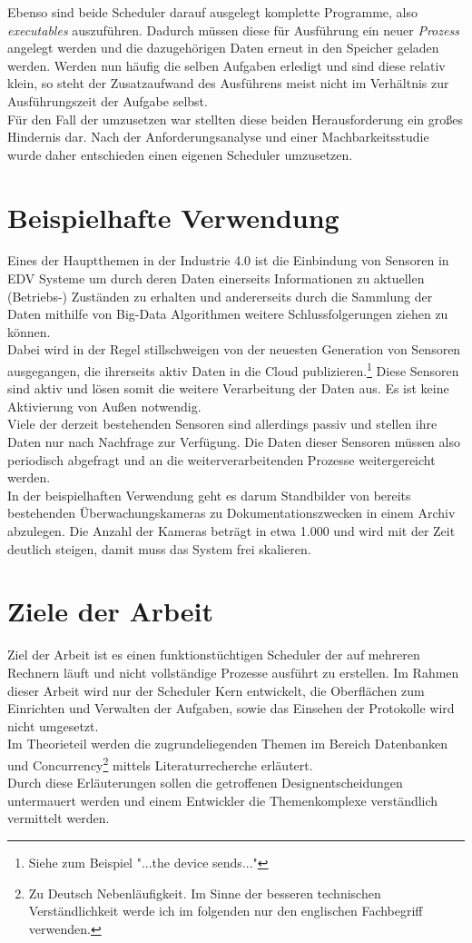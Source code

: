 Ebenso sind beide Scheduler darauf ausgelegt komplette Programme, also \emph{executables} auszuführen. Dadurch müssen diese für Ausführung ein neuer \emph{Prozess} angelegt werden und die dazugehörigen Daten erneut in den Speicher geladen werden. Werden nun häufig die selben Aufgaben erledigt und sind diese relativ klein, so steht der Zusatzaufwand des Ausführens meist nicht im Verhältnis zur Ausführungszeit der Aufgabe selbst.\\
Für den Fall der umzusetzen war stellten diese beiden Herausforderung ein großes Hindernis dar. Nach der Anforderungsanalyse und einer Machbarkeitsstudie wurde daher entschieden einen eigenen Scheduler umzusetzen.

\section{Beispielhafte Verwendung}
Eines der Hauptthemen in der Industrie 4.0 ist die Einbindung von Sensoren in EDV Systeme um durch deren Daten einerseits Informationen zu aktuellen (Betriebs-) Zuständen zu erhalten und andererseits durch die Sammlung der Daten mithilfe von Big-Data Algorithmen weitere Schlussfolgerungen ziehen zu können.\parencite[S. 36ff]{Manzei2015}\\
Dabei wird in der Regel stillschweigen von der neuesten Generation von Sensoren ausgegangen, die ihrerseits aktiv Daten in die Cloud publizieren.\footnote{Siehe zum Beispiel \parencite{ms_azureiot} "...the device sends..."} Diese Sensoren sind aktiv und lösen somit die weitere Verarbeitung der Daten aus. Es ist keine Aktivierung von Außen notwendig.\\
Viele der derzeit bestehenden Sensoren sind allerdings passiv und stellen ihre Daten nur nach Nachfrage zur Verfügung. Die Daten dieser Sensoren müssen also periodisch abgefragt und an die weiterverarbeitenden Prozesse weitergereicht werden.\\
In der beispielhaften Verwendung geht es darum Standbilder von bereits bestehenden Überwachungskameras zu Dokumentationszwecken in einem Archiv abzulegen. Die Anzahl der Kameras beträgt in etwa 1.000 und wird mit der Zeit deutlich steigen, damit muss das System frei skalieren.\\ 
\section{Ziele der Arbeit}
Ziel der Arbeit ist es einen funktionstüchtigen Scheduler der auf mehreren Rechnern läuft und nicht vollständige Prozesse ausführt zu erstellen. Im Rahmen dieser Arbeit wird nur der Scheduler Kern entwickelt, die Oberflächen zum Einrichten und Verwalten der Aufgaben, sowie das Einsehen der Protokolle wird nicht umgesetzt.
\\Im Theorieteil werden die zugrundeliegenden Themen im Bereich Datenbanken und Concurrency\footnote{Zu Deutsch Nebenläufigkeit. Im Sinne der besseren technischen Verständlichkeit werde ich im folgenden nur den englischen Fachbegriff verwenden.} mittels Literaturrecherche erläutert.\\ Durch diese Erläuterungen sollen die getroffenen Designentscheidungen untermauert werden und einem Entwickler die Themenkomplexe verständlich vermittelt werden.


